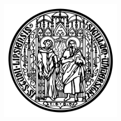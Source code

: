 
\begin{titlepage}

\begin{addmargin}[-1cm]{-3cm}
\begin{center}
\large

\hfill
\vfill

\begingroup
\color{Maroon}\spacedallcaps{\myTitle} \\ \bigskip %
\endgroup

\spacedlowsmallcaps{\myName} %

\vfill

\includegraphics[width=6cm]{Images/UniLeipzig} \\ \medskip %

\mySubtitle \\ \medskip %
\myDepartment \\
\myUni \\ \bigskip

\myTime\ 

\vfill

\end{center}
\end{addmargin}

\end{titlepage}